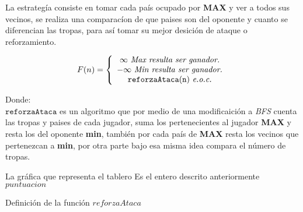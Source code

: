 \documentclass[12pt,twocolumn,draft]{article}
\begin{document}
La estrateg\'ia consiste en tomar cada pa\'is ocupado por \textbf{MAX} y ver a todos sus vecinos,
se realiza una comparac\'ion de que paises son del oponente y cuanto se diferencian las tropas, para así tomar su
mejor desici\'on de ataque o reforzamiento.

$$ 
F(n)= \left\{\begin{array}{c l}
  \infty\ \textit{Max\ resulta\ ser\ ganador.}\\
  -\infty\ \textit{Min\ resulta\ ser\ ganador.}\\
  \mathtt{reforzaAtaca(n)}\ \textit{e.o.c.}
\end{array}
\right.
$$

Donde:\\

$\mathtt{reforzaAtaca}$ es un algoritmo que por medio de una modificaici\'on a \textit{BFS} cuenta
las tropas y paises de cada jugador, suma los pertenecientes al jugador \textbf{MAX} y resta los del oponente 
\textbf{min}, tambi\'en por cada pa\'is de \textbf{MAX} resta los vecinos que pertenezcan a \textbf{min}, por otra
parte bajo esa misma idea compara el n\'umero de tropas.\\

\begin{algorithm}
\begin{algorithmic}[1]
\REQUIRE La gr\'afica que representa el tablero
\ENSURE Es el entero descrito anteriormente
\ENDFOR
{}
\ENDIF
{}
\ENDIF
{}
\ENDIF
{}
\ENDIF
{}
\ENDIF
{}
\ENDIF
{}
\ENDIF
{}
\ENDIF
\ENDFOR
\ENDWHILE
\RETURN $puntuacion$
\end{algorithmic}
\caption{Definici\'on de la funci\'on $reforzaAtaca$}
\label{reforzaAtaca}
\end{algorithm}
\end{document}
